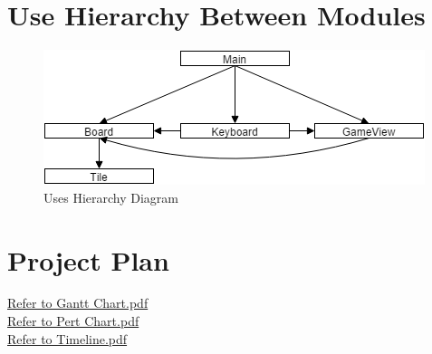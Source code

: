 \documentclass[12pt]{article}
\begin{document}
\section{Use Hierarchy Between Modules}
\begin{figure}[!htbp]
	\includegraphics[scale=0.8]{uses}
	\centering
	\caption{Uses Hierarchy Diagram}
	\label{Uses Hierarchy Diagram}
\end{figure}

\section {Project Plan}
\href{run:Gantt_Chart.pdf}{Refer to Gantt Chart.pdf}\\
\href{run:Pert_Chart.pdf}{Refer to Pert Chart.pdf}\\
\href{run:Timeline.pdf}{Refer to Timeline.pdf}\\
\end{document}
